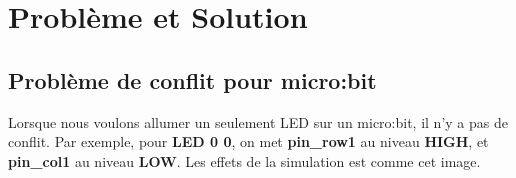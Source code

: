 \documentclass[14px]{article}
\begin{document}
	\section{Problème et Solution}
	\subsection{Problème de conflit pour micro:bit}
	Lorsque nous voulons allumer un seulement LED sur un micro:bit, il n'y a pas de conflit. Par exemple, pour \textbf{LED 0 0}, on met \textbf{pin\_row1} au niveau \textbf{HIGH}, et \textbf{pin\_col1} au niveau \textbf{LOW}. Les effets de la simulation est comme cet image.\\
	\begin{figure}[htbp]
	\end{figure}\\
\end{document}
